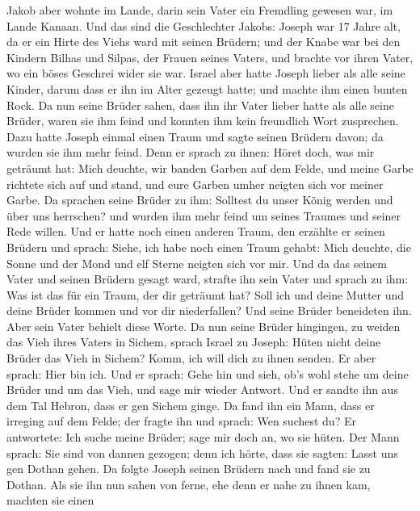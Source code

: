  Jakob aber wohnte im Lande, darin sein Vater ein
Fremdling gewesen war, im Lande Kanaan.  Und das sind die
Geschlechter Jakobs: Joseph war 17 Jahre alt, da er ein Hirte des Viehs
ward mit seinen Brüdern; und der Knabe war bei den Kindern Bilhas und
Silpas, der Frauen seines Vaters, und brachte vor ihren Vater, wo ein
böses Geschrei wider sie war.  Israel aber hatte Joseph
lieber als alle seine Kinder, darum dass er ihn im Alter gezeugt hatte;
und machte ihm einen bunten Rock.  Da nun seine Brüder
sahen, dass ihn ihr Vater lieber hatte als alle seine Brüder, waren sie
ihm feind und konnten ihm kein freundlich Wort zusprechen.
 Dazu hatte Joseph einmal einen Traum und sagte seinen
Brüdern davon; da wurden sie ihm mehr feind.  Denn er
sprach zu ihnen: Höret doch, was mir geträumt hat:  Mich
deuchte, wir banden Garben auf dem Felde, und meine Garbe richtete sich
auf und stand, und eure Garben umher neigten sich vor meiner Garbe.
 Da sprachen seine Brüder zu ihm: Solltest du unser König
werden und über uns herrschen? und wurden ihm mehr feind um seines
Traumes und seiner Rede willen.  Und er hatte noch einen
anderen Traum, den erzählte er seinen Brüdern und sprach: Siehe, ich
habe noch einen Traum gehabt: Mich deuchte, die Sonne und der Mond und
elf Sterne neigten sich vor mir.  Und da das seinem Vater
und seinen Brüdern gesagt ward, strafte ihn sein Vater und sprach zu
ihm: Was ist das für ein Traum, der dir geträumt hat? Soll ich und deine
Mutter und deine Brüder kommen und vor dir niederfallen? 
Und seine Brüder beneideten ihn. Aber sein Vater behielt diese Worte.
 Da nun seine Brüder hingingen, zu weiden das Vieh ihres
Vaters in Sichem,  sprach Israel zu Joseph: Hüten nicht
deine Brüder das Vieh in Sichem? Komm, ich will dich zu ihnen senden. Er
aber sprach: Hier bin ich.  Und er sprach: Gehe hin und
sieh, ob's wohl stehe um deine Brüder und um das Vieh, und sage mir
wieder Antwort. Und er sandte ihn aus dem Tal Hebron, dass er gen Sichem
ginge.  Da fand ihn ein Mann, dass er irreging auf dem
Felde; der fragte ihn und sprach: Wen suchest du?  Er
antwortete: Ich suche meine Brüder; sage mir doch an, wo sie hüten.
 Der Mann sprach: Sie sind von dannen gezogen; denn ich
hörte, dass sie sagten: Lasst uns gen Dothan gehen. Da folgte Joseph
seinen Brüdern nach und fand sie zu Dothan.  Als sie ihn
nun sahen von ferne, ehe denn er nahe zu ihnen kam, machten sie einen
